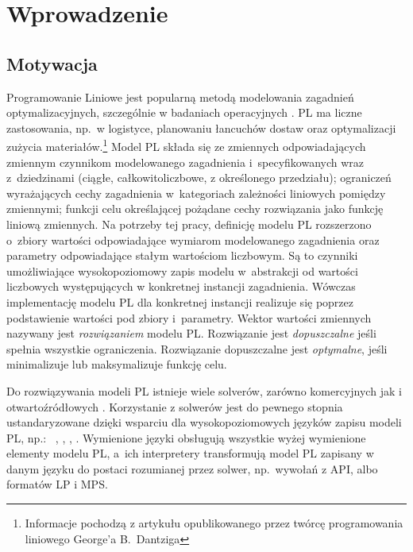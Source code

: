 
\chapter{Wprowadzenie}

\section{Motywacja}

Programowanie Liniowe  jest popularną metodą modelowania zagadnień optymalizacyjnych, szczególnie w badaniach operacyjnych \cite{williams2013model}. PL ma liczne zastosowania, np.~w logistyce, planowaniu łancuchów dostaw oraz optymalizacji zużycia materiałów.\footnote{Informacje pochodzą z artykułu opublikowanego przez twórcę programowania liniowego George'a B.~Dantziga\cite{dantzig2002linear}} %
Model PL składa się ze zmiennych odpowiadających zmiennym czynnikom modelowanego zagadnienia i~specyfikowanych wraz z~dziedzinami (ciągłe, całkowitoliczbowe, z określonego przedziału); ograniczeń wyrażających cechy zagadnienia w~kategoriach zależności liniowych pomiędzy zmiennymi; funkcji celu określającej pożądane cechy rozwiązania jako funkcję liniową zmiennych. Na potrzeby tej pracy, definicję modelu PL rozszerzono o~zbiory wartości odpowiadające wymiarom modelowanego zagadnienia oraz parametry odpowiadające stałym wartościom liczbowym. Są to czynniki umożliwiające wysokopoziomowy zapis modelu w~abstrakcji od wartości liczbowych występujących w konkretnej instancji zagadnienia. Wówczas implementację modelu PL dla konkretnej instancji realizuje się poprzez podstawienie wartości pod zbiory i~parametry.
Wektor wartości zmiennych nazywany jest \emph{rozwiązaniem} modelu PL. Rozwiązanie jest \emph{dopuszczalne} jeśli spełnia wszystkie ograniczenia. Rozwiązanie dopuszczalne jest \emph{optymalne}, jeśli minimalizuje lub maksymalizuje funkcję celu.

Do rozwiązywania modeli PL istnieje wiele solverów, zarówno komercyjnych \cite{TODO:przyklady} jak i otwartoźródłowych \cite{TODO:przyklady}. %
Korzystanie z solwerów jest do pewnego stopnia ustandaryzowane dzięki wsparciu dla wysokopoziomowych języków zapisu modeli PL, np.:~ \cite{TODO},  \cite{TODO},  \cite{TODO},  \cite{TODO}. Wymienione języki obsługują wszystkie wyżej wymienione elementy modelu PL, a~ich interpretery transformują model PL zapisany w danym języku do postaci rozumianej przez solwer, np.~wywołań z API, albo formatów LP i MPS.

